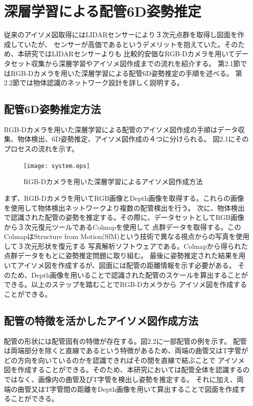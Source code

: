 \chapter{%
深層学習による配管6D姿勢推定}

従来のアイソメ図取得にはLIDARセンサーにより３次元点群を取得し図面を作成していたが、
センサーが高価であるというデメリットを抱えていた。そのため、本研究ではLIDARセンサーよりも
比較的安価なRGB-Dカメラを用いてデータセット収集から深層学習やアイソメ図作成までの流れを紹介する。
第2.1節ではRGB-Dカメラを用いた深層学習による配管6D姿勢推定の手順を述べる。
第2.2節では物体認識のネットワーク設計を詳しく説明する。


\section{配管6D姿勢推定方法}
RGB-Dカメラを用いた深層学習による配管のアイソメ図作成の手順はデータ収集、物体検出、6D姿勢推定、アイソメ図作成の４つに分けられる。
図2.1にそのプロセスの流れを示す。

\begin{figure}[htbt]
	\centering
	 \texttt{[image: system.eps]}
	 \caption{RGB-Dカメラを用いた深層学習によるアイソメ図作成方法}
	 \label{fig:f2}
\end{figure}

まず、RGB-Dカメラを用いてRGB画像とDepth画像を取得する。これらの画像を使用して物体検出ネットワークより複数の配管検出を行う。
次に、物体検出で認識された配管の姿勢を推定する。その際に、データセットとしてRGB画像から３次元復元ツールであるColmapを使用して
点群データを取得する。このColmapはStructure from Motion(SfM)という技術で異なる視点からの写真を使用して３次元形状を復元する
写真解析ソフトウェアである。Colmapから得られた点群データをもとに姿勢推定問題に取り組む。
最後に姿勢推定された結果を用いてアイソメ図を作成するが、図面には配管の距離情報を示す必要がある。
そのため、Depth画像を用いることで認識された配管のスケールを算出することができる。以上のステップを踏むことでRGB-Dカメラから
アイソメ図を作成することができる。

\section{配管の特徴を活かしたアイソメ図作成方法}
配管の形状には配管固有の特徴が存在する。図2.2に一部配管の例を示す。
配管は両端部分を除くと直線であるという特徴があるため、両端の曲管又はT字管がどの方向を向いているのかを認識できればその間を直線で結ぶことで
アイソメ図を作成することができる。そのため、本研究においては配管全体を認識するのではなく、画像内の曲管及びT字管を検出し姿勢を推定する。
それに加え、両端の曲管又はT字管間の距離をDepth画像を用いて算出することで図面を作成することができる。

